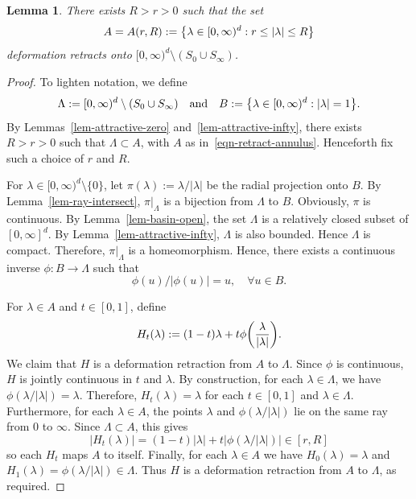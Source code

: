 \documentclass[11pt]{article}
\theoremstyle{plain}
\newtheorem{lem}[thm]{Lemma}
\theoremstyle{definition}
\numberwithin{equation}{section}
\newcommand{\eqb}{\begin{equation}}
\newcommand{\eqe}{\end{equation}}
\newcommand{\eqbn}{\begin{equation*}}
\newcommand{\eqen}{\end{equation*}}
\let\originalleft\left
\let\originalright\right
\renewcommand{\left}{\mathopen{}\mathclose\bgroup\originalleft}
\renewcommand{\right}{\aftergroup\egroup\originalright}
\begin{document}
\begin{lem} \label{lem-retract}
There exists $R > r > 0$ such that the set
\eqb \label{eqn-retract-annulus} 
A = A(r,R) := \left\{ \lambda \in [0,\infty)^d  : r \leq |\lambda| \leq R \right\} 
\eqe 
deformation retracts onto $[0,\infty)^d \setminus (S_0\cup S_\infty)$. 
\end{lem}
\begin{proof}  
To lighten notation, we define
\eqbn
\Lambda := [0,\infty)^d \setminus (S_0 \cup S_\infty) 
\quad \text{and} \quad 
B := \left\{ \lambda \in [0,\infty)^d : |\lambda| = 1 \right\} .
\eqen 
By Lemmas~\ref{lem-attractive-zero} and~\ref{lem-attractive-infty}, there exists $R > r > 0$ such that $\Lambda \subset A$, with $A$ as in~\eqref{eqn-retract-annulus}. Henceforth fix such a choice of $r$ and $R$. 

For $\lambda \in [0,\infty)^d \setminus \{0\}$, let $\pi(\lambda) := \lambda/|\lambda|$ be the radial projection onto $B$. 
By Lemma~\ref{lem-ray-intersect}, $\pi|_\Lambda$ is a bijection from $\Lambda$ to $B$. 
Obviously, $\pi$ is continuous. 
By Lemma~\ref{lem-basin-open}, the set $\Lambda$ is a relatively closed subset of $[0,\infty]^d$. By Lemma~\ref{lem-attractive-infty}, $\Lambda$ is also bounded. Hence $\Lambda$ is compact. 
Therefore, $\pi|_\Lambda$ is a homeomorphism. 
Hence, there exists a continuous inverse $\phi : B\to \Lambda$ such that
\eqbn
\phi(u) / |\phi(u)| = u ,\quad \forall u \in B .
\eqen 

For $\lambda \in A$ and $t\in [0,1]$, define 
\eqb \label{eqn-retract-def}
H_t(\lambda) :=  (1-t)  \lambda + t \phi\left( \frac{\lambda}{|\lambda|} \right) .
\eqe 
We claim that $H$ is a deformation retraction from $A$ to $\Lambda$. 
Since $\phi$ is continuous, $H$ is jointly continuous in $t$ and $\lambda$. 
By construction, for each $\lambda \in \Lambda$, we have $\phi(\lambda/|\lambda|) = \lambda$. 
Therefore, $H_t(\lambda) = \lambda$ for each $t\in [0,1]$ and $\lambda\in \Lambda$.
Furthermore, for each $\lambda \in A$, the points $\lambda$ and $\phi(\lambda/|\lambda|)$ lie on the same ray from 0 to $\infty$. Since $\Lambda \subset A$, this gives
\eqbn
|H_t(\lambda)| = (1-t) |\lambda| + t |\phi(\lambda/|\lambda|)|  \in [r,R]  
\eqen
so each $H_t$ maps $A$ to itself.  
Finally, for each $\lambda\in A$ we have $H_0(\lambda) = \lambda$ and $H_1(\lambda) = \phi(\lambda/|\lambda|) \in \Lambda$. Thus $H$ is a deformation retraction from $A$ to $\Lambda$, as required.
\end{proof}
\end{document}
